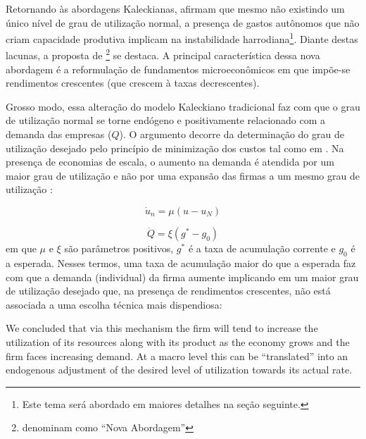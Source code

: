 Retornando às abordagens Kaleckianas, \textcite{girardi_normal_2018} afirmam que mesmo não existindo um único nível de grau de utilização normal, a presença de gastos autônomos que não criam capacidade produtiva implicam na instabilidade harrodiana\footnote{Este tema será abordado em maiores detalhes na seção seguinte.}. Diante destas lacunas, a proposta de \textcite{nikiforos_utilization_2016}\footnote{\textcite{girardi_normal_2018} denominam como ``Nova Abordagem''} se destaca. A principal característica dessa nova abordagem é a reformulação de fundamentos microeconômicos em que impõe-se rendimentos crescentes (que crescem à taxas decrescentes). 

Grosso modo, essa alteração do modelo Kaleckiano tradicional faz com que o grau de utilização normal se torne endógeno e positivamente relacionado com a demanda das empresas ($Q$). O argumento decorre da determinação do grau de utilização desejado pelo princípio de minimização dos custos tal como em \textcite{kurz_normal_1986}. Na presença de economias de escala, o aumento na demanda é atendida por um maior grau de utilização e não por uma expansão das firmas a um mesmo grau de utilização \cite[p.~442]{nikiforos_utilization_2016}:

\begin{equation}
\label{utilNiki}
    \dot u_n = \mu (u - u_N)
\end{equation}

\begin{equation}
\label{NIKI}
\dot Q = \xi (g^* - g_0)
\end{equation}
em que $\mu$ e $\xi$ são parâmetros positivos, $g^*$ é a taxa de acumulação corrente e $g_0$ é a esperada. Nesses termos, uma taxa de acumulação maior do que a esperada faz com que a demanda (individual) da firma aumente implicando em um maior grau de utilização desejado que, na presença de rendimentos crescentes, não está associada a uma escolha técnica mais dispendiosa:

\begin{citacao}
We concluded that via this mechanism the firm will tend to increase the utilization of its resources along with its product as the economy grows and the firm faces increasing demand. At
a macro level this can be ``translated'' into an endogenous adjustment of the desired level of utilization towards its actual rate. \textcite[p.~459]{nikiforos_utilization_2016}
\end{citacao}

